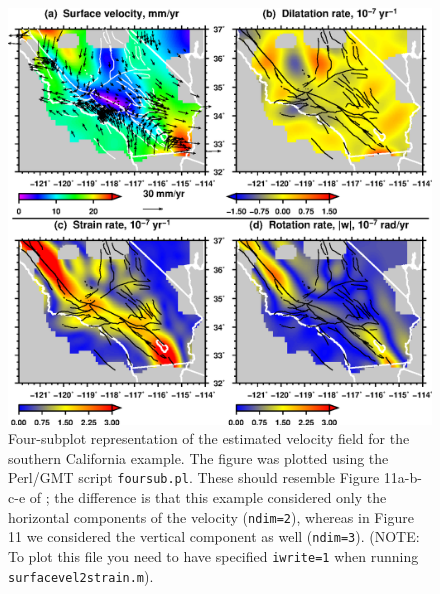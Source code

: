 \documentclass[11pt,titlepage,fleqn]{article}
\begin{document}
\begin{figure}
\includegraphics[width=16cm]{foursub_06_m1.eps}
\caption[]
{{
Four-subplot representation of the estimated velocity field for the southern California example.
The figure was plotted using the Perl/GMT script {\tt foursub.pl}.
These should resemble Figure 11a-b-c-e of \citet{Tape2009gps}; the difference is that this example considered only the horizontal components of the velocity ({\tt ndim=2}), whereas in Figure 11 we considered the vertical component as well ({\tt ndim=3}).
(NOTE: To plot this file you need to have specified {\tt iwrite=1} when running {\tt surfacevel2strain.m}).
\label{fig:2D_gmt2}
}}
\end{figure}

\end{document}
